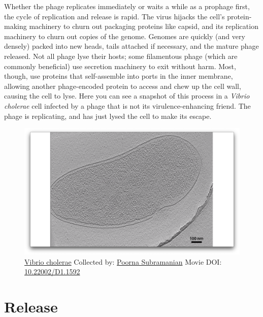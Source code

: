 \documentclass[]{tufte-book}
\begin{document}
Whether the phage replicates immediately or waits a while as a prophage
first, the cycle of replication and release is rapid. The virus hijacks
the cell's protein-making machinery to churn out packaging proteins like
capsid, and its replication machinery to churn out copies of the genome.
Genomes are quickly (and very densely) packed into new heads, tails
attached if necessary, and the mature phage released. Not all phage lyse
their hosts; some filamentous phage (which are commonly beneficial) use
secretion machinery to exit without harm. Most, though, use proteins
that self-assemble into ports in the inner membrane, allowing another
phage-encoded protein to access and chew up the cell wall, causing the
cell to lyse. Here you can see a snapshot of this process in a
\emph{Vibrio cholerae} cell infected by a phage that is not its
virulence-enhancing friend. The phage is replicating, and has just lysed
the cell to make its escape.





\begin{figure}
\includegraphics{movie_stills/10_7} \caption[\protect\hyperlink{tree}{Vibrio cholerae} Collected by:
\protect\hyperlink{poorna_subramanian}{Poorna Subramanian} Movie DOI:
\href{https://doi.org/10.22002/D1.1592}{10.22002/D1.1592}]{\protect\hyperlink{tree}{Vibrio cholerae} Collected by:
\protect\hyperlink{poorna_subramanian}{Poorna Subramanian} Movie DOI:
\href{https://doi.org/10.22002/D1.1592}{10.22002/D1.1592}}\label{fig:10-7}
\end{figure}

\section{Release}\label{release}
\end{document}
